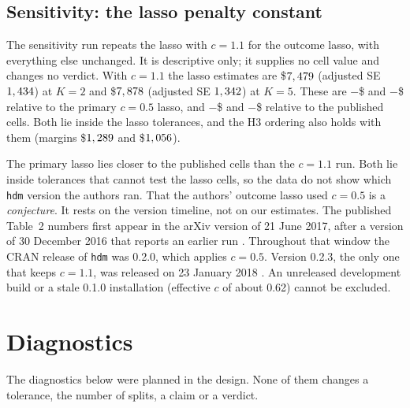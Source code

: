 \documentclass[11pt]{article}
\def\absvalaux-#1\relax{#1}
\newcommand{\absval}[1]{\expandafter\absvalaux#1\relax}
\newcommand{\negusd}[1]{$-$\$\absval{#1}}
\newcommand{\var}[1]{\texttt{#1}}
\begin{document}
\subsection{Sensitivity: the lasso penalty constant}
\label{sec:sens}

The sensitivity run repeats the lasso with $c = 1.1$ for the outcome lasso, with
everything else unchanged. It is descriptive only; it supplies no cell value and changes
no verdict. With $c = 1.1$ the lasso estimates are \$$7,479$ (adjusted SE
$1,434$) at $K = 2$ and \$$7,878$ (adjusted SE
$1,342$) at $K = 5$. These are \negusd{\SensCElevenMinusMainTwo} and
\negusd{\SensCElevenMinusMainFive} relative to the primary $c = 0.5$ lasso, and
\negusd{\SensCElevenDiffTwo} and \negusd{\SensCElevenDiffFive} relative to the published
cells. Both lie inside the lasso tolerances, and the H3 ordering also holds with them
(margins \$$1,289$ and \$$1,056$).

The primary lasso lies closer to the published cells than the $c = 1.1$ run. Both lie
inside tolerances that cannot test the lasso cells, so the data do not show which
\var{hdm} version the authors ran. That the authors' outcome lasso used $c = 0.5$ is a
\emph{conjecture}. It rests on the version timeline, not on our estimates. The published
Table~2 numbers first appear in the arXiv version of 21 June 2017, after a version of 30
December 2016 that reports an earlier run
\citep{chernozhukov2018dml,chernozhukov2016dmlv4}. Throughout that
window the CRAN release of \var{hdm} was 0.2.0, which applies $c = 0.5$. Version 0.2.3,
the only one that keeps $c = 1.1$, was released on 23 January 2018 \citep{hdm_cran}. An
unreleased development build or a stale 0.1.0 installation (effective $c$ of about 0.62)
cannot be excluded.

\section{Diagnostics}
\label{sec:diagnostics}

The diagnostics below were planned in the design. None of them changes a tolerance, the
number of splits, a claim or a verdict.
\end{document}
